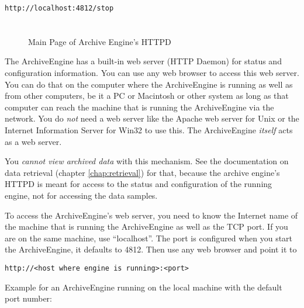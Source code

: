 \begin{lstlisting}[frame=none,keywordstyle=\sffamily]
    http://localhost:4812/stop
\end{lstlisting}

\section{} \label{sec:enginehttp} %
\begin{figure}[htb]
\begin{center}
\end{center}
\caption{\label{fig:engine:main}Main Page of Archive Engine's HTTPD}
\end{figure}

The ArchiveEngine has a built-in web server (HTTP Daemon) for status
and configuration information.  You can use any web browser to access
this web server.  You can do that on the computer where the
ArchiveEngine is running as well as from other computers, be it a PC
or Macintosh or other system as long as that computer can reach the
machine that is running the ArchiveEngine via the network.  You do
\emph{not} need a web server like the Apache web server for Unix or
the Internet Information Server for Win32 to use this. The
ArchiveEngine \emph{itself} acts as a web server.

You \emph{cannot view archived data} with this mechanism.  See the
documentation on data retrieval (chapter \ref{chap:retrieval}) for
that, because the archive engine's HTTPD is meant for access to the
status and configuration of the running engine, not for accessing the
data samples.

To access the ArchiveEngine's web server, you need to know the
Internet name of the machine that is running the ArchiveEngine as well
as the TCP port.  If you are on the same machine, use ``localhost''.
The port is configured when you start the ArchiveEngine, it defaults
to 4812. Then use any web browser and point it to

\begin{lstlisting}[frame=none,keywordstyle=\sffamily]
    http://<host where engine is running>:<port>
\end{lstlisting}

\noindent Example for an ArchiveEngine running on the local machine with the
default port number:

